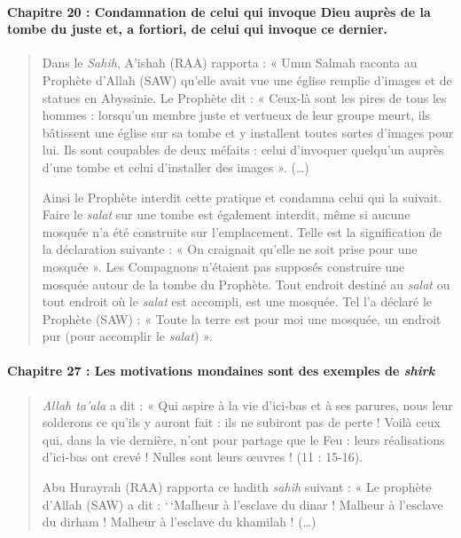 \paragraph{{Chapitre 20} : Condamnation de celui qui invoque Dieu
auprès de la tombe du juste et, a fortiori, de celui qui invoque ce
dernier.}
\begin{quote}
Dans le \emph{Sahih}, A'ishah (RAA) rapporta : « Umm Salmah raconta au
Prophète d'Allah (SAW) qu'elle avait vue une église remplie d'images et
de statues en Abyssinie. Le Prophète dit : « Ceux-là sont les pires de
tous les hommes : lorsqu'un membre juste et vertueux de leur groupe
meurt, ils bâtissent une église sur sa tombe et y installent toutes
sortes d'images pour lui. Ils sont coupables de deux méfaits : celui
d'invoquer quelqu'un auprès d'une tombe et celui d'installer des images
». (\ldots)

Ainsi le Prophète interdit cette pratique et condamna celui qui la
suivait. Faire le \emph{salat} sur une tombe est également interdit,
même si aucune mosquée n'a été construite sur l'emplacement. Telle est
la signification de la déclaration suivante : « On craignait qu'elle ne
soit prise pour une mosquée ». Les Compagnons n'étaient pas supposés
construire une mosquée autour de la tombe du Prophète. Tout endroit
destiné au \emph{salat} ou tout endroit où le \emph{salat} est accompli,
est une mosquée. Tel l'a déclaré le Prophète (SAW) : « Toute la terre
est pour moi une mosquée, un endroit pur (pour accomplir le
\emph{salat}) ».
\end{quote}
\paragraph{{Chapitre 27} : Les motivations mondaines sont des
exemples de \emph{shirk}}
\begin{quote}
\emph{Allah ta'ala} a dit : « Qui aspire à la vie d'ici-bas et à ses
parures, nous leur solderons ce qu'ils y auront fait : ils ne subiront
pas de perte ! Voilà ceux qui, dans la vie dernière, n'ont pour partage
que le Feu : leurs réalisations d'ici-bas ont crevé ! Nulles sont leurs
œuvres ! (11 : 15-16).

Abu Hurayrah (RAA) rapporta ce hadith \emph{sahih} suivant : « Le
prophète d'Allah (SAW) a dit : `\,`Malheur à l'esclave du dinar !
Malheur à l'esclave du dirham ! Malheur à l'esclave du khamilah !
(\ldots)
\end{quote}
